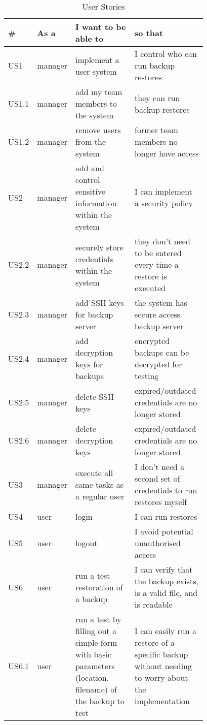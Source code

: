 		\begin{table}[H]
			\small
			\centering
			\setlength{\belowcaptionskip}{15pt plus 3pt minus 2pt}
			\caption{User Stories}
                         
			\begin{tabular}{|l|l|p{0.39\linewidth}|p{0.39\linewidth}|} \hline
				\textbf{\#} & \textbf{As a} & \textbf{I want to be able to} & \textbf{so that} \\ \hline
				US1 & manager & implement a user system & I control who can run backup restores \\ \hline
				US1.1 & manager & add my team members to the system & they can run backup restores \\ \hline
				US1.2 & manager & remove users from the system & former team members no longer have access \\ \hline
				US2 & manager & add and control sensitive information within the system & I can implement a security policy \\ \hline
				US2.2 & manager & securely store credentials within the system & they don't need to be entered every time a restore is executed \\ \hline
				US2.3 & manager & add SSH keys for backup server & the system has secure access backup server \\ \hline
				US2.4 & manager & add decryption keys for backups & encrypted backups can be decrypted for testing \\ \hline
				US2.5 & manager & delete SSH keys & expired/outdated credentials are no longer stored \\ \hline
				US2.6 & manager & delete decryption keys & expired/outdated credentials are no longer stored \\ \hline
				US3 & manager & execute all same tasks as a regular user & I don't need a second set of credentials to run restores myself \\ \hline
				US4 & user & login & I can run restores \\ \hline
				US5 & user & logout & I avoid potential unauthorised access \\ \hline
				US6 & user & run a test restoration of a backup & I can verify that the backup exists, is a valid file, and is readable \\ \hline
				US6.1 & user & run a test by filling out a simple form with basic parameters (location, filename) of the backup to test & I can easily run a restore of a specific backup without needing to worry about the implementation \\ \hline

\end{tabular}
\end{table}
